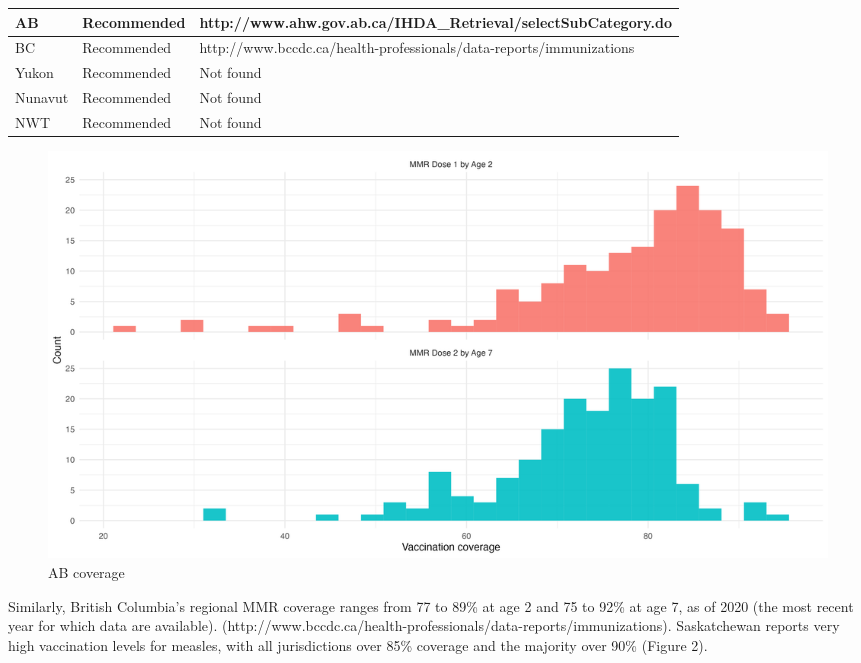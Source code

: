 \documentclass[12pt,a4paper]{article}
\begin{document}
\begin{table}[h!]
\begin{tabular}{lp{3cm}p{10cm}}
AB       & Recommended               & http://www.ahw.gov.ab.ca/IHDA\_Retrieval/selectSubCategory.do                                                                                                                       \\ \hline
BC       & Recommended               & http://www.bccdc.ca/health-professionals/data-reports/immunizations                                                                                                                 \\ \hline
Yukon    & Recommended               & Not found                                                                                                                                                                           \\ \hline
Nunavut  & Recommended               & Not found                                                                                                                                                                           \\ \hline
NWT      & Recommended               & Not found
\end{tabular}
\end{table}

\begin{figure}[h]
\includegraphics[width=\linewidth]{report-figs/f1.png}
\caption{AB coverage}
\label{fig:abcov}
\end{figure}

Similarly, British Columbia’s regional MMR coverage ranges from 77 to 89\% at age 2 and 75 to 92\% at age 7, as of 2020 (the most recent year for which data are available). (http://www.bccdc.ca/health-professionals/data-reports/immunizations). Saskatchewan reports very high vaccination levels for measles, with all jurisdictions over 85\% coverage and the majority over 90\% (Figure 2).
\end{document}
